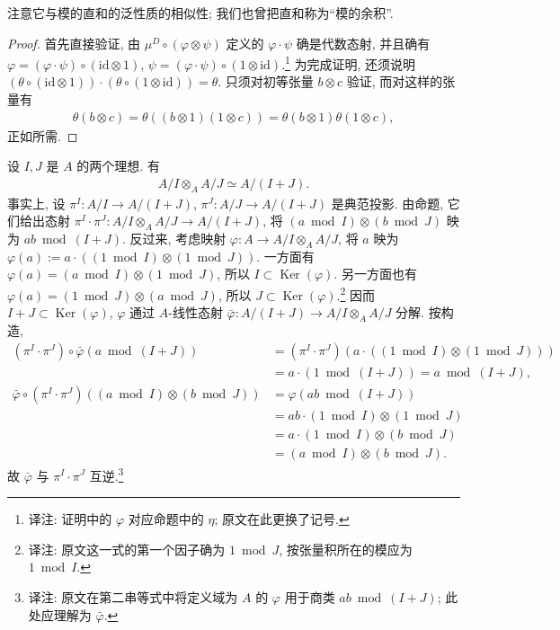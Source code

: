 注意它与模的直和的泛性质的相似性; 我们也曾把直和称为``模的余积''.
\begin{proof}
首先直接验证, 由 $\mu^D\circ(\varphi\otimes\psi)$ 定义的 $\varphi\cdot\psi$ 确是代数态射, 并且确有 $\varphi=(\varphi\cdot\psi)\circ(\mathrm{id}\otimes1)$, $\psi=(\varphi\cdot\psi)\circ(1\otimes\mathrm{id})$.\footnote{译注: 证明中的 $\varphi$ 对应命题中的 $\eta$; 原文在此更换了记号.} 为完成证明, 还须说明 $(\theta\circ(\mathrm{id}\otimes1))\cdot(\theta\circ(1\otimes\mathrm{id}))=\theta$. 只须对初等张量 $b\otimes c$ 验证, 而对这样的张量有
\begin{align*}
\theta(b\otimes c)=\theta((b\otimes1)(1\otimes c))=\theta(b\otimes1)\theta(1\otimes c),
\end{align*}
正如所需.
\end{proof}
\begin{example*}
设 $I,J$ 是 $A$ 的两个理想. 有
\begin{align*}
A/I\otimes_A A/J\simeq A/(I+J).
\end{align*}
事实上, 设 $\pi^I:A/I\longrightarrow A/(I+J)$, $\pi^J:A/J\longrightarrow A/(I+J)$ 是典范投影. 由命题, 它们给出态射 $\pi^I\cdot\pi^J:A/I\otimes_A A/J\longrightarrow A/(I+J)$, 将 $(a\bmod I)\otimes(b\bmod J)$ 映为 $ab\bmod(I+J)$. 反过来, 考虑映射 $\varphi:A\longrightarrow A/I\otimes_A A/J$, 将 $a$ 映为 $\varphi(a):=a\cdot((1\bmod I)\otimes(1\bmod J))$. 一方面有 $\varphi(a)=(a\bmod I)\otimes(1\bmod J)$, 所以 $I\subset\operatorname{Ker}(\varphi)$. 另一方面也有 $\varphi(a)=(1\bmod J)\otimes(a\bmod J)$, 所以 $J\subset\operatorname{Ker}(\varphi)$.\footnote{译注: 原文这一式的第一个因子确为 $1\bmod J$, 按张量积所在的模应为 $1\bmod I$.} 因而 $I+J\subset\operatorname{Ker}(\varphi)$, $\varphi$ 通过 $A$-线性态射 $\bar\varphi:A/(I+J)\longrightarrow A/I\otimes_A A/J$ 分解. 按构造,
\begin{align*}
(\pi^I\cdot\pi^J)\circ\bar\varphi(a\bmod(I+J))
&=(\pi^I\cdot\pi^J)(a\cdot((1\bmod I)\otimes(1\bmod J)))\\
&=a\cdot(1\bmod(I+J))=a\bmod(I+J),\\
\bar\varphi\circ(\pi^I\cdot\pi^J)((a\bmod I)\otimes(b\bmod J))
&=\varphi(ab\bmod(I+J))\\
&=ab\cdot(1\bmod I)\otimes(1\bmod J)\\
&=a\cdot(1\bmod I)\otimes(b\bmod J)\\
&=(a\bmod I)\otimes(b\bmod J).
\end{align*}
故 $\bar\varphi$ 与 $\pi^I\cdot\pi^J$ 互逆.\footnote{译注: 原文在第二串等式中将定义域为 $A$ 的 $\varphi$ 用于商类 $ab\bmod(I+J)$; 此处应理解为 $\bar\varphi$.}
\end{example*}
